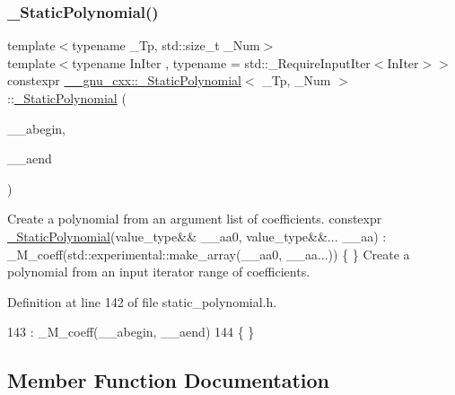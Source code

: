 \subsubsection{\texorpdfstring{\+\_\+\+Static\+Polynomial()}{\_StaticPolynomial()}\hspace{0.1cm}{\footnotesize\ttfamily [7/7]}}
{\footnotesize\ttfamily template$<$typename \+\_\+\+Tp, std\+::size\+\_\+t \+\_\+\+Num$>$ \\
template$<$typename In\+Iter , typename  = std\+::\+\_\+\+Require\+Input\+Iter$<$\+In\+Iter$>$$>$ \\
constexpr \hyperlink{class____gnu__cxx_1_1__StaticPolynomial}{\+\_\+\+\_\+gnu\+\_\+cxx\+::\+\_\+\+Static\+Polynomial}$<$ \+\_\+\+Tp, \+\_\+\+Num $>$\+::\hyperlink{class____gnu__cxx_1_1__StaticPolynomial}{\+\_\+\+Static\+Polynomial} (\begin{DoxyParamCaption}\item[{const In\+Iter \&}]{\+\_\+\+\_\+abegin,  }\item[{const In\+Iter \&}]{\+\_\+\+\_\+aend }\end{DoxyParamCaption})\hspace{0.3cm}{\ttfamily [inline]}}

Create a polynomial from an argument list of coefficients. constexpr \hyperlink{class____gnu__cxx_1_1__StaticPolynomial}{\+\_\+\+Static\+Polynomial}(value\+\_\+type\&\& \+\_\+\+\_\+aa0, value\+\_\+type\&\&... \+\_\+\+\_\+aa) \+: \+\_\+\+M\+\_\+coeff(std\+::experimental\+::make\+\_\+array(\+\_\+\+\_\+aa0, \+\_\+\+\_\+aa...)) \{ \} Create a polynomial from an input iterator range of coefficients. 

Definition at line 142 of file static\+\_\+polynomial.\+h.


\begin{DoxyCode}
143         : \_M\_coeff(\_\_abegin, \_\_aend)
144         \{ \}
\end{DoxyCode}


\subsection{Member Function Documentation}
\mbox{\label{class____gnu__cxx_1_1__StaticPolynomial_a111ee5aedd5ae8c0b4d8fa8f29d1f9b9}} 
